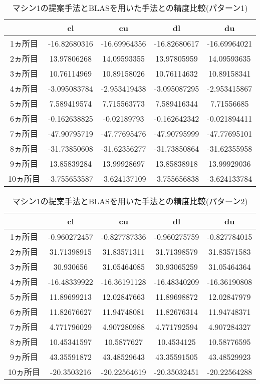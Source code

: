 \documentclass[11pt,a4paper]{jsreport}
\theoremstyle{definition}
\begin{document}
\begin{table}[H]
\centering
\begin{tabular}{|c|c|c|c|c|}
\hline
& cl & cu & dl & du \\ \hline
1ヵ所目 & -16.82680316 & -16.69964356 & -16.82680617 & -16.69964021 \\ \hline
2ヵ所目 & 13.97806268 & 14.09593355 & 13.97805959 & 14.09593635 \\ \hline
3ヵ所目 & 10.76114969 & 10.89158026 & 10.76114632 & 10.89158341 \\ \hline
4ヵ所目 & -3.095083784 & -2.953419438 & -3.095087295 & -2.953415867 \\ \hline
5ヵ所目 & 7.589419574 & 7.715563773 & 7.589416344 & 7.71556685 \\ \hline
6ヵ所目 & -0.162638825 & -0.02189793 & -0.162642342 & -0.021894411 \\ \hline
7ヵ所目 & -47.90795719 & -47.77695476 & -47.90795999 & -47.77695101 \\ \hline
8ヵ所目 & -31.73850608 & -31.62356277 & -31.73850864 & -31.62355958 \\ \hline
9ヵ所目 & 13.85839284 & 13.99928697 & 13.85838918 & 13.99929036 \\ \hline
10ヵ所目 & -3.755653587 & -3.624137109 & -3.755656838 & -3.624133784 \\ \hline
\end{tabular}
\caption{マシン1の提案手法とBLASを用いた手法との精度比較(パターン1)}
\end{table}

\begin{table}[H]
\centering
\begin{tabular}{|c|c|c|c|c|}
\hline
 & cl & cu & dl & du \\ \hline
1ヵ所目 & -0.960272457 & -0.827787336 & -0.960275759 & -0.827784015 \\ \hline
2ヵ所目 & 31.71398915 & 31.83571311 & 31.71398579 & 31.83571583 \\ \hline
3ヵ所目 & 30.930656 & 31.05464085 & 30.93065259 & 31.05464364 \\ \hline
4ヵ所目 & -16.48339922 & -16.36191128 & -16.48340209 & -16.36190808 \\ \hline
5ヵ所目 & 11.89699213 & 12.02847663 & 11.89698872 & 12.02847979 \\ \hline
6ヵ所目 & 11.82676627 & 11.94748081 & 11.82676314 & 11.94748371 \\ \hline
7ヵ所目 & 4.771796029 & 4.907280988 & 4.771792594 & 4.907284327 \\ \hline
8ヵ所目 & 10.45341597 & 10.5877627 & 10.4534125 & 10.58776595 \\ \hline
9ヵ所目 & 43.35591872 & 43.48529643 & 43.35591505 & 43.48529923 \\ \hline
10ヵ所目 & -20.3503216 & -20.22564619 & -20.35032451 & -20.22564288 \\ \hline
\end{tabular}
\caption{マシン1の提案手法とBLASを用いた手法との精度比較(パターン2)}
\end{table}
\end{document}
